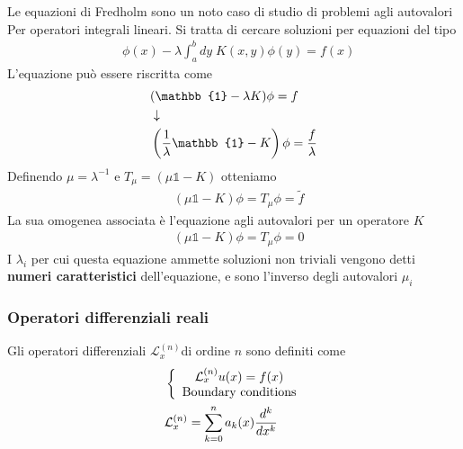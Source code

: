 Le equazioni di Fredholm sono un noto caso di studio di problemi agli autovalori Per operatori integrali lineari. Si tratta di cercare soluzioni per equazioni del tipo
\begin{align}
	&\phi(x) - \lambda \int_{a}^{b} dy \; K(x,y) \phi(y) = f(x) 
\end{align}
L'equazione può essere riscritta come
\begin{align}
	&(\mathbb{1} - \lambda K)\phi=f \nextpassage
	&\left(\frac{1}{\lambda}\mathbb{1} - K \right)\phi=\frac{f}{\lambda}
\end{align}
Definendo $\mu = \lambda^{-1}$ e $T_\mu = (\mu \mathbb{1} - K)$ otteniamo 
\begin{align}
	&\left(\mu\mathbb{1} - K \right)\phi= T_\mu \phi = \tilde{f}
\end{align}
La sua omogenea associata è l'equazione agli autovalori per un operatore $K$
\begin{align}
	&\left(\mu\mathbb{1} - K \right)\phi= T_\mu \phi = 0
\end{align}
I $\lambda_i$ per cui questa equazione ammette soluzioni non triviali vengono detti \textbf{numeri caratteristici} dell'equazione, e sono l'inverso degli autovalori $\mu_i$

\newpage

\subsubsection{Operatori differenziali reali}

Gli operatori differenziali $\mathcal{L}_x^{(n)}$di ordine $n$ sono definiti come
\begin{align}
	&\left\{ \begin{array}{cc} \mathcal{L}_x^{(n)} u(x) = f(x)\\ \text{Boundary conditions} \end{array} \right.\\
	&\mathcal{L}_x^{(n)} = \sum_{k=0}^{n} a_k(x) \frac{d^k}{dx^k}
\end{align}


